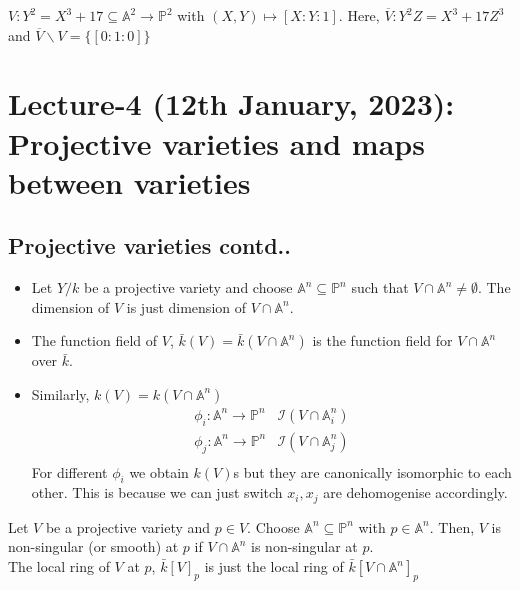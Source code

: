 \documentclass[oneside, 12pt, ]{scrbook}
\newcommand{\I}{\mathcal{I}}
\newcommand{\Aa}{\mathbb{A}}
\newcommand{\PP}{\mathbb{P}}
\theoremstyle{theorem}
\begin{document}
\begin{example}
$V : Y^2 = X^3 + 17 \subseteq \mathbb{A}^2 \rightarrow \mathbb{P}^2$ with $(X,Y) \mapsto [X: Y: 1]$. Here, $\overline{V} : Y^2Z =X^3 +17Z^3$ and $\overline{V} \backslash V = \{[0:1:0]\}$
\end{example}

\chapter{Lecture-4 (12th January, 2023): Projective varieties and maps between varieties}

\section{Projective varieties contd..}

\begin{definition}
\begin{itemize}
\item Let $Y / k$ be a projective variety and choose $\Aa^n \subseteq \PP^n$ such that $V \cap \Aa^n \neq \emptyset$. The dimension of $V$ is just dimension of $V \cap \Aa^n$.
\item The function field of $V$, $\bar{k}(V) = \bar{k}(V \cap \Aa^n)$ is the function field for $V \cap \Aa^n$ over $\bar{k}$.
\item Similarly, $k(V) = k(V \cap \Aa^n)$
\begin{align*}
\phi_{i}: \Aa^n \rightarrow \PP^n &\I(V \cap \Aa_{i}^n) \\
\phi_{j}: \Aa^n \rightarrow \PP^n &\I(V \cap \Aa_{j}^n) \\ 
\end{align*}
For different $\phi_{i}$ we obtain $k(V)$s but they are canonically isomorphic to each other. This is because we can just switch $x_{i},x_{j}$ are dehomogenise accordingly. 
\end{itemize}
\end{definition}

\begin{definition}
Let $V$ be a projective variety and $p \in V$. Choose $\Aa^n \subseteq \PP^n$ with $p \in \Aa^n$. Then, $V$ is non-singular (or smooth) at $p$ if $V\cap \Aa^n$ is non-singular at $p$. \\

The local ring of $V$ at $p$, $\bar{k}[V]_{p}$ is just the local ring of $\bar{k}[V \cap \Aa^n]_{p}$
\end{definition}
\end{document}

